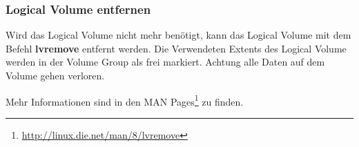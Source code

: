 \subsubsection{Logical Volume entfernen}

Wird das Logical Volume nicht mehr benötigt, kann das Logical Volume mit dem Befehl \textbf{lvremove} 
entfernt werden. Die Verwendeten Extents des Logical Volume werden in der Volume Group als frei markiert. Achtung alle Daten auf dem Volume gehen verloren. 


Mehr Informationen sind in den MAN Pages\footnote{\href{http://linux.die.net/man/8/lvremove}{http://linux.die.net/man/8/lvremove}} zu finden.
